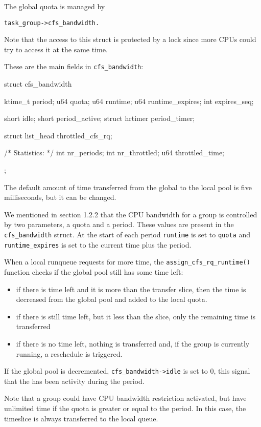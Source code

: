 The global quota is managed by 
\begin{verbatim}
task_group->cfs_bandwidth.
\end{verbatim}
Note that the access to this struct is protected by a lock since more CPUs could try to access it at the same time.

These are the main fields in \verb|cfs_bandwidth|:
\begin{code}
struct cfs_bandwidth {
	ktime_t			period;
	u64			quota;
	u64			runtime;
	u64			runtime_expires;
	int			expires_seq;
    
    short			idle;
	short			period_active;
	struct hrtimer		period_timer;
	
	struct list_head	throttled_cfs_rq;

	/* Statistics: */
	int			nr_periods;
	int			nr_throttled;
	u64			throttled_time;
};
\end{code}
The default amount of time transferred from the global to the local pool is five milliseconds, but it can be changed.

We mentioned in section 1.2.2 that the CPU bandwidth for a group is controlled by two parameters, a quota and a period. These values are present in the \verb|cfs_bandwidth| struct. At the start of each period \verb|runtime| is set to \verb|quota| and \verb|runtime_expires| is set to the current time plus the period.

When a local runqueue requests for more time, the \verb|assign_cfs_rq_runtime()| function checks if the global pool still has some time left:
\begin{itemize}
    \item if there is time left and it is more than the transfer slice, then the time is decreased from the global pool and added to the local quota.
    \item if there is still time left, but it less than the slice, only the remaining time is transferred
    \item if there is no time left, nothing is transferred and, if the group is currently running, a reschedule is triggered.
\end{itemize}
If the global pool is decremented, \verb|cfs_bandwidth->idle| is set to 0, this signal that the has been activity during the period.

Note that a group could have CPU bandwidth restriction activated, but have unlimited time if the quota is greater or equal to the period. In this case, the timeslice is always transferred to the local queue.

